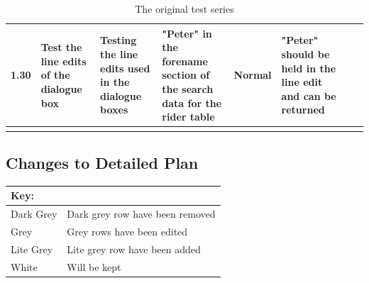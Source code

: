 \begin{landscape}
\begin{center}
\begin{longtable}{|p{1.5cm}|p{2.5cm}|p{2.5cm}|p{2cm}|p{2cm}|p{2cm}|p{2cm}|p{2cm}|}
        1.30 & Test the line edits of the dialogue box & Testing the line edits used in the dialogue boxes & "Peter" in the forename section of the search data for the rider table & Normal & "Peter" should be held in the line edit and can be returned & & \\ \hline
        \caption{The original test series}
        \label{tab:Original} 
    \end{longtable}
\end{center}



\subsection{Changes to Detailed Plan}

\begin{tabular}{|l|l|}
\hline
Key: & \\ \hline
\rowcolor{DarkGrey} Dark Grey & Dark grey row have been removed \\ \hline
\rowcolor{Grey} Grey & Grey rows have been edited \\\hline
\rowcolor{LiteGrey} Lite Grey & Lite grey row have been added\\ \hline
White & Will be kept \\ \hline
\end{tabular}



\end{landscape}
